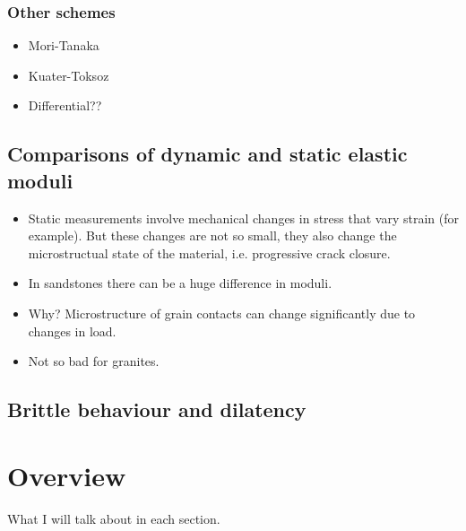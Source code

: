 \subsubsection{Other schemes}
\begin{itemize}
    \item Mori-Tanaka
    \item Kuater-Toksoz
    \item Differential??
\end{itemize}

\subsection{Comparisons of dynamic and static elastic moduli}
\begin{itemize}
    \item Static measurements involve mechanical changes in stress that vary strain (for example). But these changes are not so small, they also change the microstructual state of the material, i.e. progressive crack closure.
    \item In sandstones there can be a huge difference in moduli.
    \item Why? Microstructure of grain contacts can change significantly due to changes in load.
    \item Not so bad for granites.
\end{itemize}

\subsection{Brittle behaviour and dilatency}


\section{Overview}
What I will talk about in each section.